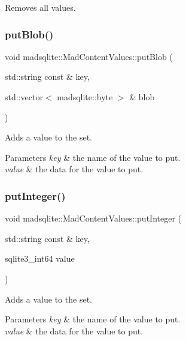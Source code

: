 Removes all values. \hypertarget{classmadsqlite_1_1_mad_content_values_a372ac7c6da044c9fa95fe01db3d3b166}{}\label{classmadsqlite_1_1_mad_content_values_a372ac7c6da044c9fa95fe01db3d3b166} 
\subsubsection{\texorpdfstring{put\+Blob()}{putBlob()}}
{\footnotesize\ttfamily void madsqlite\+::\+Mad\+Content\+Values\+::put\+Blob (\begin{DoxyParamCaption}\item[{std\+::string const \&}]{key,  }\item[{std\+::vector$<$ madsqlite\+::byte $>$ \&}]{blob }\end{DoxyParamCaption})}

Adds a value to the set.


\begin{DoxyParams}{Parameters}
{\em key} & the name of the value to put. \\
\hline
{\em value} & the data for the value to put. \\
\hline
\end{DoxyParams}
\hypertarget{classmadsqlite_1_1_mad_content_values_a7441e7284d67e99d467fe37cb4120bec}{}\label{classmadsqlite_1_1_mad_content_values_a7441e7284d67e99d467fe37cb4120bec} 
\subsubsection{\texorpdfstring{put\+Integer()}{putInteger()}}
{\footnotesize\ttfamily void madsqlite\+::\+Mad\+Content\+Values\+::put\+Integer (\begin{DoxyParamCaption}\item[{std\+::string const \&}]{key,  }\item[{sqlite3\+\_\+int64}]{value }\end{DoxyParamCaption})}

Adds a value to the set.


\begin{DoxyParams}{Parameters}
{\em key} & the name of the value to put. \\
\hline
{\em value} & the data for the value to put. \\
\hline
\end{DoxyParams}
\hypertarget{classmadsqlite_1_1_mad_content_values_a00a8a96f001511a9201b6b6436ae27b7}{}\label{classmadsqlite_1_1_mad_content_values_a00a8a96f001511a9201b6b6436ae27b7} 
